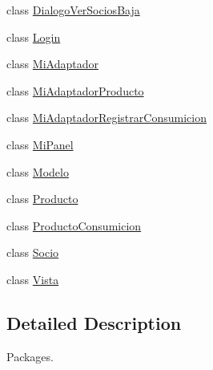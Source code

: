 \begin{DoxyCompactItemize}
class \mbox{\hyperlink{classsociedad2_1_1_dialogo_ver_socios_baja}{Dialogo\+Ver\+Socios\+Baja}}
\item 
class \mbox{\hyperlink{classsociedad2_1_1_login}{Login}}
\item 
class \mbox{\hyperlink{classsociedad2_1_1_mi_adaptador}{Mi\+Adaptador}}
\item 
class \mbox{\hyperlink{classsociedad2_1_1_mi_adaptador_producto}{Mi\+Adaptador\+Producto}}
\item 
class \mbox{\hyperlink{classsociedad2_1_1_mi_adaptador_registrar_consumicion}{Mi\+Adaptador\+Registrar\+Consumicion}}
\item 
class \mbox{\hyperlink{classsociedad2_1_1_mi_panel}{Mi\+Panel}}
\item 
class \mbox{\hyperlink{classsociedad2_1_1_modelo}{Modelo}}
\item 
class \mbox{\hyperlink{classsociedad2_1_1_producto}{Producto}}
\item 
class \mbox{\hyperlink{classsociedad2_1_1_producto_consumicion}{Producto\+Consumicion}}
\item 
class \mbox{\hyperlink{classsociedad2_1_1_socio}{Socio}}
\item 
class \mbox{\hyperlink{classsociedad2_1_1_vista}{Vista}}
\end{DoxyCompactItemize}


\subsection{Detailed Description}
Packages. 
